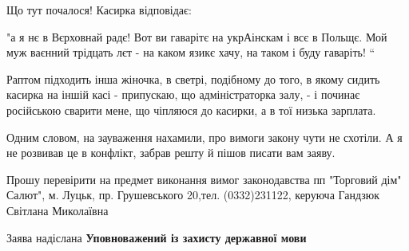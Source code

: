 Що тут почалося! Касирка відповідає:

"а я нє в Вєрховнай радє! Вот ви гаварітє на укрАінскам і всє в Польщє. Мой муж
ваєнний трідцать лєт - на каком язикє хачу, на таком і буду гаваріть! “

Раптом підходить інша жіночка, в светрі, подібному до того, в якому сидить
касирка на іншій касі - припускаю, що адміністраторка залу, - і починає
російською сварити мене, що чіпляюся до касирки, а в тої низька зарплата.

Одним словом, на зауваження нахамили, про вимоги закону чути не схотіли. А я не
розвивав це в конфлікт, забрав решту й пішов писати вам заяву.

Прошу перевірити на предмет виконання вимог законодавства пп "Торговий дім"
Салют", м. Луцьк, пр. Грушевського 20,тел. (0332)231122, керуюча Гандзюк
Світлана Миколаївна

Заява надіслана \textbf{Уповноважений із захисту державної мови}
